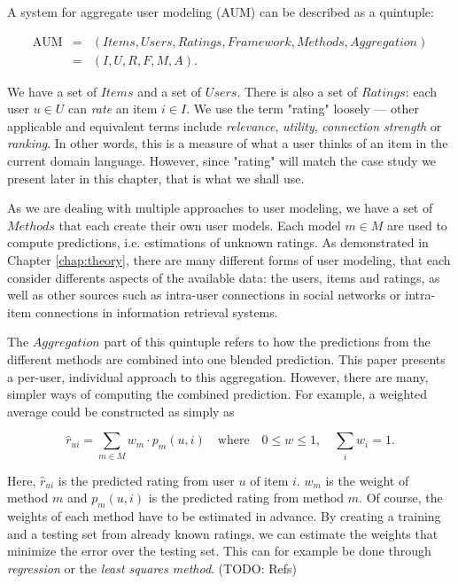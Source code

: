 A system for aggregate user modeling (AUM) can be described as a quintuple:

\begin{eqnarray*}
  \mathrm{AUM} &=& (Items, Users, Ratings, Framework, Methods, Aggregation)\\
               &=& (I,U,R,F,M,A).
\end{eqnarray*}

We have a set of $Items$ and a set of $Users$.
There is also a set of $Ratings$: each user $u \in U$ can \emph{rate} an item $i \in I$.
We use the term "rating" loosely --- other applicable and equivalent terms include \emph{relevance}, \emph{utility},
\emph{connection strength} or \emph{ranking}. In other words, this is a measure of what a user thinks of an item
in the current domain language. However, since "rating" will match the case study we present later in this chapter,
that is what we shall use.

As we are dealing with multiple approaches to user modeling, we have a set of $Methods$ that each create their own
user models. Each model $m \in M$ are used to compute predictions, i.e. estimations of unknown ratings.
As demonstrated in Chapter \ref{chap:theory}, there are many different forms of user modeling,
that each consider differents aspects of the available data: the users, items and ratings, as well as 
other sources such as intra-user connections in social networks or intra-item connections in information retrieval systems.

The $Aggregation$ part of this quintuple refers to how the predictions from the different methods are combined
into one blended prediction. 
This paper presents a per-user, individual approach to this aggregation. However, there are many, simpler ways of computing the
combined prediction. For example, a weighted average could be constructed as simply as 

\begin{equation*}
  \hat{r}_{ui} = \sum_{m \in M} w_m \cdot p_m(u,i) 
  \quad \text{where}
  \quad 0 \leq w \leq 1, 
  \quad \sum_{i} w_i = 1.
\end{equation*}

Here, $\hat{r}_{ui}$ is the predicted rating from user $u$ of item $i$.
$w_m$ is the weight of method $m$ and $p_m(u,i)$ is the predicted rating from method $m$.
Of course, the weights of each method have to be estimated in advance.
By creating a training and a testing set from already known ratings, we can estimate the weights
that minimize the error over the testing set. 
This can for example be done through \emph{regression} or the \emph{least squares method}.
(TODO: Refs)




